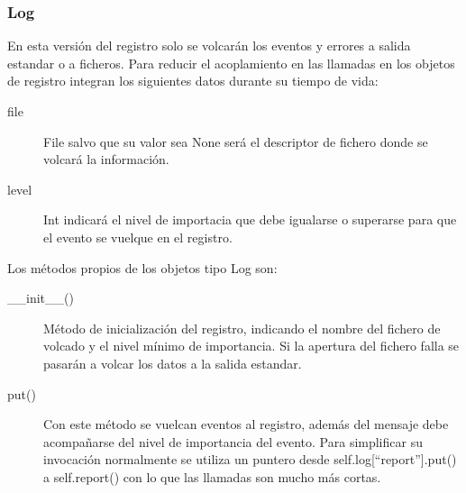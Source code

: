 \documentclass[a4paper,spanish,12pt]{book}
\begin{document}
\subsubsection{Log}
En esta versión del registro solo se volcarán los eventos y errores a salida estandar o a ficheros. Para reducir el acoplamiento en las llamadas en los objetos de registro integran los siguientes datos durante su tiempo de vida:
\begin{description}
	\item[file]File salvo que su valor sea None será el descriptor de fichero donde se volcará la información.
	\item[level]Int indicará el nivel de importacia que debe igualarse o superarse para que el evento se vuelque en el registro.
\end{description}
Los m\'etodos propios de los objetos tipo Log son:
\begin{description}
	\item[\_\_init\_\_()]M\'etodo de inicialización del registro, indicando el nombre del fichero de volcado y el nivel mínimo de importancia. Si la apertura del fichero falla se pasarán a volcar los datos a la salida estandar.
	\item[put()]Con este m\'etodo se vuelcan eventos al registro, además del mensaje debe acompañarse del nivel de importancia del evento. Para simplificar su invocación normalmente se utiliza un puntero desde self.log[``report''].put() a self.report() con lo que las llamadas son mucho más cortas.
\end{description}
\end{document}
